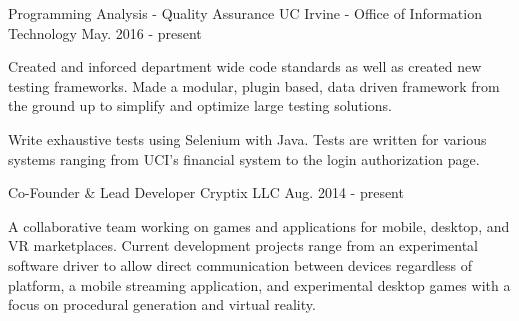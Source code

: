 

\begin{cventries}

  \cventry
    {Programming Analysis - Quality Assurance} %
    {UC Irvine - Office of Information Technology} %
    {} %
    {May. 2016 - present} %
    {
      \begin{cvitems} %
        \item {Created and inforced department wide code standards as well as %
        created new testing frameworks. Made a modular, plugin based, data driven %
        framework from the ground up to simplify and optimize large testing solutions.}
        \item {Write exhaustive tests using Selenium with Java. Tests are written %
        for various systems ranging from UCI's financial system to the login %
        authorization page.}
      \end{cvitems}
    }

  \cventry
    {Co-Founder \& Lead Developer} %
    {Cryptix LLC} %
    {} %
    {Aug. 2014 - present} %
    {
      \begin{cvitems} %
        \item {A collaborative team working on games and applications for %
        mobile, desktop, and VR marketplaces. Current development projects range %
        from an experimental software driver to allow direct communication %
        between devices regardless of platform, a mobile streaming application, %
        and experimental desktop games with a focus on procedural generation and %
        virtual reality.}
      \end{cvitems}
    }


\end{cventries}
